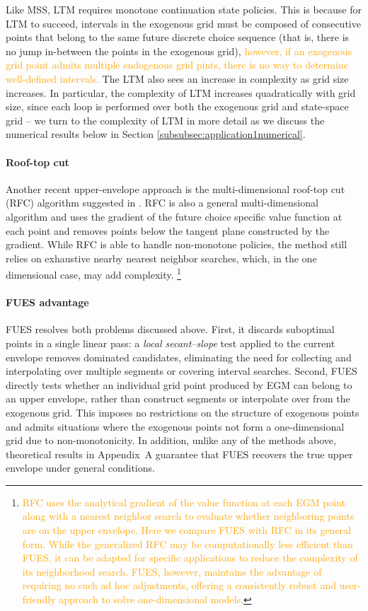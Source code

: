 \documentclass[12pt]{article}
\begin{document}
Like MSS, LTM requires monotone continuation state policies. This is because for LTM to succeed, intervals in the exogenous grid must be composed of consecutive points that belong to the same future discrete choice sequence (that is, there is no jump in-between the points in the exogenous grid), \textcolor{orange}{however, if an exogenous grid point admits multiple endogenous grid pints, there is no way to determine well-defined intervals.}  The LTM also sees an increase in complexity as grid size increases. In particular, the complexity of LTM increases quadratically with grid size, since each loop is performed over both the exogenous grid and state-space grid -- we turn to the complexity of LTM in more detail as we discuss the numerical results below in Section \ref{subsubsec:application1numerical}. 

\paragraph{Roof-top cut} Another recent upper-envelope approach is the multi-dimensional roof-top cut (RFC) algorithm suggested in \cite{DS2024RFC}. RFC is also a general multi-dimensional algorithm and uses the gradient of the future choice specific value function at each point and removes points below the tangent plane constructed by the gradient. While RFC is able to handle non-monotone policies, the method still relies on exhaustive nearby nearest neighbor searches, which, in the one dimensional case, may add complexity. \footnote{\textcolor{orange}{RFC uses the analytical gradient of the value function at each EGM point along with a nearest neighbor search to evaluate whether neighboring points are on the upper envelope. Here we compare FUES with RFC in its general form. While the generalized RFC may be computationally less efficient than FUES, it can be adapted for specific applications to reduce the complexity of its neighborhood search. FUES, however, maintains the advantage of requiring no such ad hoc adjustments, offering a consistently robust and user-friendly approach to solve one-dimensional models.}}

\paragraph{FUES advantage} FUES resolves both problems discussed above. First, it discards suboptimal points in a single
linear pass: a \emph{local secant--slope} test applied to the current envelope
removes dominated candidates, eliminating the need for collecting and interpolating over multiple segments or
covering interval searches.  Second, FUES directly tests whether an individual grid point produced by EGM can belong to an upper envelope, rather than construct segments or interpolate over from the exogenous grid. This imposes no restrictions on the
structure of exogenous points and admits situations where the exogenous points not form a one-dimensional grid due to non-monotonicity. In
addition, unlike any of the methods above, theoretical results in Appendix~A guarantee that FUES recovers the
true upper envelope under general conditions. 
\end{document}
